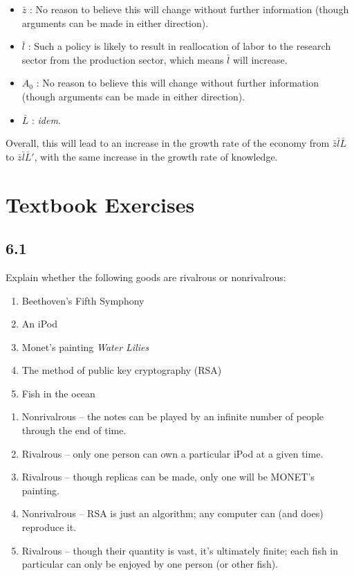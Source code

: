 \documentclass{article}
\newenvironment{solution}{\color{red}}{\color{black}}
\begin{document}
\begin{solution}

\begin{itemize}
\item $\bar{z}$ : No reason to believe this will change without further information (though arguments can be made in either direction).
\item $\bar{l}$ : Such a policy is likely to result in reallocation of labor to the research sector from the production sector, which means $\bar{l}$ will increase.
\item $A_0$ : No reason to believe this will change without further information (though arguments can be made in either direction).
\item $\bar{L}$ : \textit{idem}.
\end{itemize}

Overall, this will lead to an increase in the growth rate of the economy from $\bar{z} \bar{l} \bar{L}$ to $\bar{z} \bar{l} \bar{L}'$, with the same increase in the growth rate of knowledge.

\end{solution}

\section{Textbook Exercises}

\subsection*{6.1}

Explain whether the following goods are rivalrous or nonrivalrous:

\begin{enumerate}
\item Beethoven's Fifth Symphony
\item An iPod
\item Monet's painting \textit{Water Lilies}
\item The method of public key cryptography (RSA)
\item Fish in the ocean
\end{enumerate}

\begin{solution}

\begin{enumerate}
\item Nonrivalrous -- the notes can be played by an infinite number of people through the end of time.
\item Rivalrous -- only one person can own a particular iPod at a given time.
\item Rivalrous -- though replicas can be made, only one will be MONET's painting.
\item Nonrivalrous -- RSA is just an algorithm; any computer can (and does) reproduce it.
\item Rivalrous -- though their quantity is vast, it's ultimately finite; each fish in particular can only be enjoyed by one person (or other fish).
\end{enumerate}

\end{solution}
\end{document}
